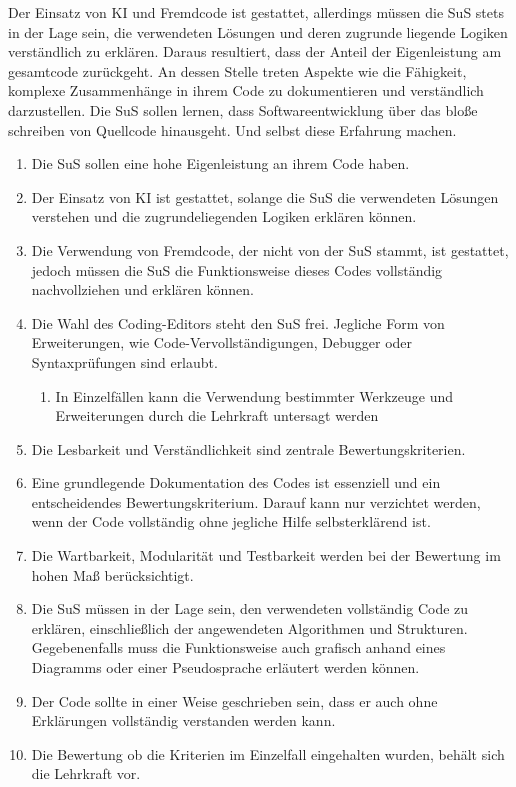 \documentclass[a4paper,12pt]{article}
\begin{document}
Der Einsatz von KI und Fremdcode ist gestattet, allerdings müssen die SuS stets in der Lage sein, die verwendeten Lösungen und deren zugrunde liegende Logiken verständlich zu erklären. Daraus resultiert, dass der Anteil der Eigenleistung am gesamtcode zurückgeht. An dessen Stelle treten Aspekte wie die Fähigkeit, komplexe Zusammenhänge in ihrem Code zu dokumentieren und verständlich darzustellen. Die SuS sollen lernen, dass Softwareentwicklung über das bloße schreiben von Quellcode hinausgeht. Und selbst diese Erfahrung machen.

\begin{enumerate}[label=\S\ \arabic*]
    \item Die SuS sollen eine hohe Eigenleistung an ihrem Code haben.
    \item Der Einsatz von KI ist gestattet, solange die SuS die verwendeten Lösungen verstehen und die zugrundeliegenden Logiken erklären können.
    \item Die Verwendung von Fremdcode, der nicht von der SuS stammt, ist gestattet, jedoch müssen die SuS die Funktionsweise dieses Codes vollständig nachvollziehen und erklären können.
    \item Die Wahl des Coding-Editors steht den SuS frei. Jegliche Form von Erweiterungen, wie Code-Vervollständigungen, Debugger oder Syntaxprüfungen sind erlaubt.
    \begin{enumerate}[label=\S\ \arabic*\alph*]
        \item In Einzelfällen kann die Verwendung bestimmter Werkzeuge und Erweiterungen durch die Lehrkraft untersagt werden
    \end{enumerate}
    \item Die Lesbarkeit und Verständlichkeit sind zentrale Bewertungskriterien.
    \item Eine grundlegende Dokumentation des Codes ist essenziell und ein entscheidendes Bewertungskriterium. Darauf kann nur verzichtet werden, wenn der Code vollständig ohne jegliche Hilfe selbsterklärend ist.
    \item Die Wartbarkeit, Modularität und Testbarkeit werden bei der Bewertung im hohen Maß berücksichtigt.
    \item Die SuS müssen in der Lage sein, den verwendeten vollständig Code zu erklären, einschließlich der angewendeten Algorithmen und Strukturen. Gegebenenfalls muss die Funktionsweise auch grafisch anhand eines Diagramms oder einer Pseudosprache erläutert werden können.
    \item Der Code sollte in einer Weise geschrieben sein, dass er auch ohne Erklärungen vollständig verstanden werden kann.
    \item Die Bewertung ob die Kriterien im Einzelfall eingehalten wurden, behält sich die Lehrkraft vor.
\end{enumerate}
\end{document}
